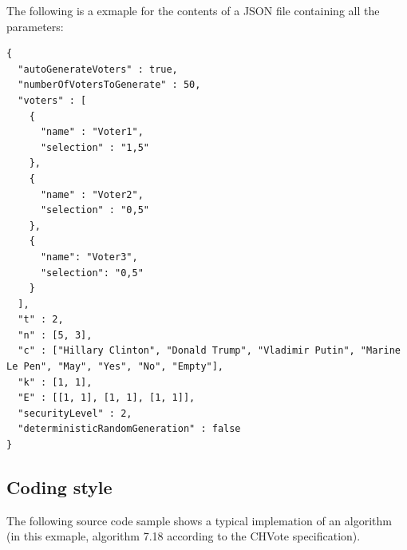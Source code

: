 The following is a exmaple for the contents of a JSON file containing all the parameters:

\begin{verbatim}
{
  "autoGenerateVoters" : true,
  "numberOfVotersToGenerate" : 50,
  "voters" : [
    {
      "name" : "Voter1",
      "selection" : "1,5"
    },
    {
      "name" : "Voter2",
      "selection" : "0,5"
    },
    {
      "name": "Voter3",
      "selection": "0,5"
    }
  ],
  "t" : 2,
  "n" : [5, 3],
  "c" : ["Hillary Clinton", "Donald Trump", "Vladimir Putin", "Marine Le Pen", "May", "Yes", "No", "Empty"],
  "k" : [1, 1],
  "E" : [[1, 1], [1, 1], [1, 1]],
  "securityLevel" : 2,
  "deterministicRandomGeneration" : false
}
\end{verbatim}

\subsection{Coding style}
The following source code sample shows a typical implemation of an algorithm (in this exmaple, algorithm 7.18 according to the CHVote specification).

